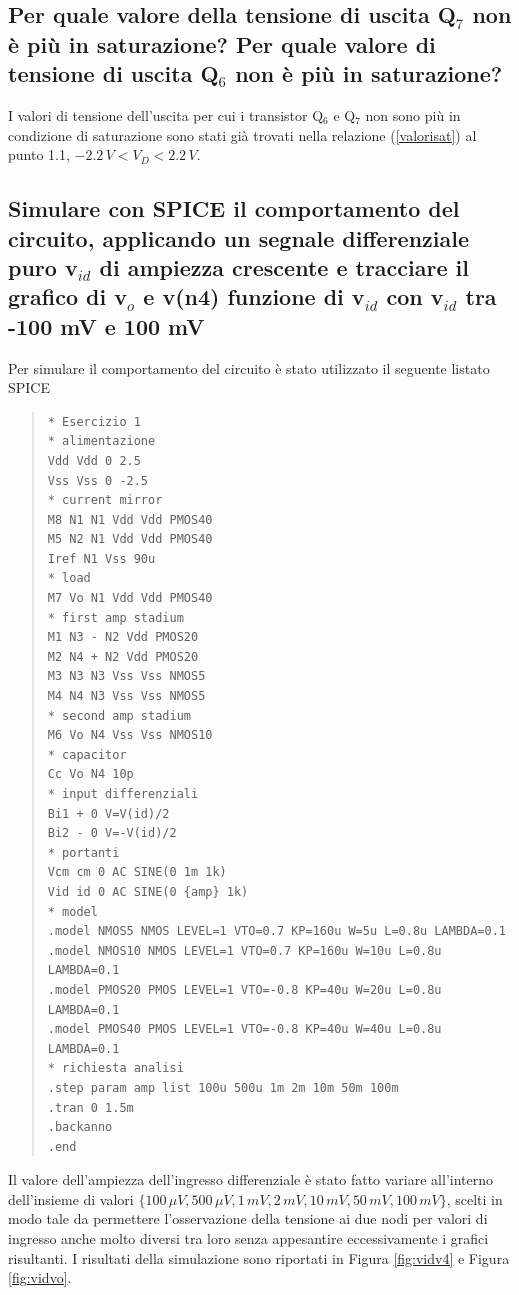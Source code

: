 \documentclass[a4paper,10pt]{article}
\begin{document}
\subsection{Per quale valore della tensione di uscita Q$_7$ non è più in saturazione? Per quale valore di tensione di uscita Q$_6$ non è più in saturazione?}
I valori di tensione dell'uscita per cui i transistor Q$_6$ e Q$_7$ non sono più in condizione di saturazione sono stati già trovati nella relazione (\ref{valorisat}) al punto 1.1, $-2.2\,V < V_D < 2.2\,V$.

\subsection{Simulare con SPICE il comportamento del circuito, applicando un segnale differenziale puro v$_{id}$ di ampiezza crescente e tracciare il grafico di v$_o$ e v(n4) funzione di v$_{id}$ con v$_{id}$ tra -100 mV e 100 mV}
Per simulare il comportamento del circuito è stato utilizzato il seguente listato SPICE
\begin{quote}
\begin{verbatim}
* Esercizio 1
* alimentazione
Vdd Vdd 0 2.5
Vss Vss 0 -2.5
* current mirror
M8 N1 N1 Vdd Vdd PMOS40
M5 N2 N1 Vdd Vdd PMOS40
Iref N1 Vss 90u
* load
M7 Vo N1 Vdd Vdd PMOS40
* first amp stadium
M1 N3 - N2 Vdd PMOS20
M2 N4 + N2 Vdd PMOS20
M3 N3 N3 Vss Vss NMOS5
M4 N4 N3 Vss Vss NMOS5
* second amp stadium
M6 Vo N4 Vss Vss NMOS10
* capacitor
Cc Vo N4 10p
* input differenziali
Bi1 + 0 V=V(id)/2
Bi2 - 0 V=-V(id)/2
* portanti
Vcm cm 0 AC SINE(0 1m 1k)
Vid id 0 AC SINE(0 {amp} 1k)
* model
.model NMOS5 NMOS LEVEL=1 VTO=0.7 KP=160u W=5u L=0.8u LAMBDA=0.1
.model NMOS10 NMOS LEVEL=1 VTO=0.7 KP=160u W=10u L=0.8u LAMBDA=0.1
.model PMOS20 PMOS LEVEL=1 VTO=-0.8 KP=40u W=20u L=0.8u LAMBDA=0.1
.model PMOS40 PMOS LEVEL=1 VTO=-0.8 KP=40u W=40u L=0.8u LAMBDA=0.1
* richiesta analisi
.step param amp list 100u 500u 1m 2m 10m 50m 100m
.tran 0 1.5m
.backanno
.end
\end{verbatim}
\end{quote}
Il valore dell'ampiezza dell'ingresso differenziale è stato fatto variare all'interno dell'insieme di valori $\{100\, \mu V, 500\, \mu V, 1\, mV, 2\, mV, 10\, mV, 50\, mV, 100\, mV\}$, scelti in modo tale da permettere l'osservazione della tensione ai due nodi per valori di ingresso anche molto diversi tra loro senza appesantire eccessivamente i grafici risultanti. I risultati della simulazione sono riportati in Figura \ref{fig:vidv4} e Figura \ref{fig:vidvo}.\\
\end{document}
